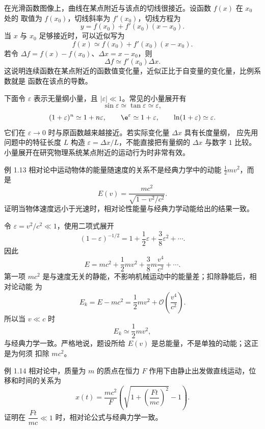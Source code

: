 在光滑函数图像上，曲线在某点附近与该点的切线很接近。设函数 $f(x)$ 在 $x_0$ 处的
取值为 $f(x_0)$，切线斜率为 $f'(x_0)$，切线方程为
\begin{equation}
 y=f(x_0)+f'(x_0)(x-x_0).
\end{equation}
当 $x$ 与 $x_0$ 足够接近时，可以近似写为
\begin{equation}
 f(x)\simeq f(x_0)+f'(x_0)(x-x_0).
\end{equation}
若令 $\Delta f=f(x)-f(x_0)$、$\Delta x=x-x_0$，则
\begin{equation}
 \Delta f\simeq f'(x_0)\Delta x.
\end{equation}
这说明连续函数在某点附近的函数值变化量，近似正比于自变量的变化量，比例系数就是
函数在该点的导数。

下面令 $\varepsilon$ 表示无量纲小量，且 $|\varepsilon|\ll1$。常见的小量展开有
\[
 \sin\varepsilon\simeq\tan\varepsilon\simeq\varepsilon,
\]
\[
 (1+\varepsilon)^n\simeq1+n\varepsilon,\qquad
 \e^{\varepsilon}\simeq1+\varepsilon,\qquad
 \ln(1+\varepsilon)\simeq\varepsilon.
\]
它们在 $\varepsilon\to0$ 时与原函数越来越接近。若实际变化量 $\Delta x$ 具有长度量纲，
应先用问题中的特征长度 $L$ 构造 $\varepsilon=\Delta x/L$，不能直接把有量纲的 $\Delta x$ 与数字 $1$ 比较。
小量展开在研究物理系统某点附近的运动行为时非常有效。

\begin{origexamplebox}{例 1.13}
相对论中运动物体的能量随速度的关系不是经典力学中的动能 $\frac12mv^2$，而是
\[
 E(v)=\frac{mc^2}{\sqrt{1-v^2/c^2}}.
\]
证明当物体速度远小于光速时，相对论性能量与经典力学动能给出的结果一致。
\end{origexamplebox}

\begin{xesolution}
令 $\varepsilon=v^2/c^2\ll1$，使用二项式展开
\[
 (1-\varepsilon)^{-1/2}
 =1+\frac12\varepsilon+\frac38\varepsilon^2+\cdots.
\]
因此
\[
 E=mc^2+\frac12mv^2+\frac38m\frac{v^4}{c^2}+\cdots.
\]
第一项 $mc^2$ 是与速度无关的静能，不影响机械运动中的能量差；扣除静能后，相对论动能
为
\[
 E_k=E-mc^2=\frac12mv^2+\mathcal O\!\left(\frac{v^4}{c^2}\right).
\]
所以当 $v\ll c$ 时
\[
 \boxed{E_k\simeq\frac12mv^2},
\]
与经典力学一致。严格地说，题设所给 $E(v)$ 是总能量，不是单独的动能；这正是为何须
扣除 $mc^2$。
\end{xesolution}

\begin{origexamplebox}{例 1.14}
相对论中，质量为 $m$ 的质点在恒力 $F$ 作用下由静止出发做直线运动，位移和时间的关系为
\[
 x(t)=\frac{mc^2}{F}
 \left(\sqrt{1+\left(\frac{Ft}{mc}\right)^2}-1\right).
\]
证明在 $\dfrac{Ft}{mc}\ll1$ 时，相对论公式与经典力学一致。
\end{origexamplebox}

